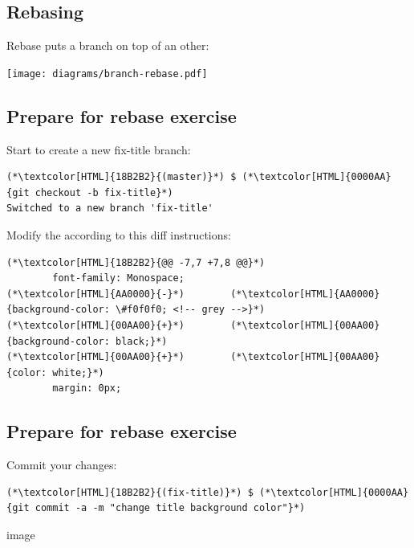 \subsection{Rebasing}
\begin{frame}[fragile]
  \subslidetitle
  Rebase puts a branch on top of an other:
  \centerline{\texttt{[image: diagrams/branch-rebase.pdf]}}
\end{frame}

\subsection{Prepare for rebase exercise}
\begin{frame}[fragile]
  \subslidetitle

  Start to create a new fix-title branch:
  \begin{lstlisting}
(*\textcolor[HTML]{18B2B2}{(master)}*) $ (*\textcolor[HTML]{0000AA}{git checkout -b fix-title}*)
Switched to a new branch 'fix-title'
\end{lstlisting}

  Modify the  according to this diff instructions:
  \begin{lstlisting}
(*\textcolor[HTML]{18B2B2}{@@ -7,7 +7,8 @@}*)
        font-family: Monospace;
(*\textcolor[HTML]{AA0000}{-}*)        (*\textcolor[HTML]{AA0000}{background-color: \#f0f0f0; <!-- grey -->}*)
(*\textcolor[HTML]{00AA00}{+}*)        (*\textcolor[HTML]{00AA00}{background-color: black;}*)
(*\textcolor[HTML]{00AA00}{+}*)        (*\textcolor[HTML]{00AA00}{color: white;}*)
        margin: 0px;
\end{lstlisting}
\end{frame}

\subsection{Prepare for rebase exercise}
\begin{frame}[fragile]
  \subslidetitle
  Commit your changes:
  \begin{lstlisting}
(*\textcolor[HTML]{18B2B2}{(fix-title)}*) $ (*\textcolor[HTML]{0000AA}{git commit -a -m "change title background color"}*)
\end{lstlisting}

  image
\end{frame}

